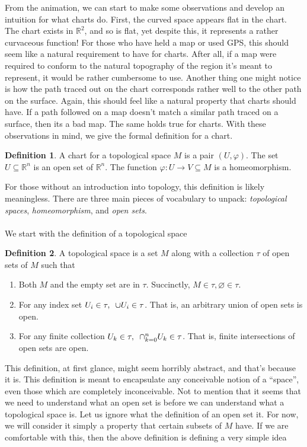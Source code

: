 \documentclass[]{article}
\let\emptyset\varnothing %
\let\phi\varphi %
\newcommand\<{\ensuremath{\left\langle}}
\renewcommand\>{\ensuremath{\right\rangle}}
\newcommand{\RR}{\ensuremath{\mathbb{R}}}
\theoremstyle{definition}
\newtheorem{definition}{Definition}[section]
\theoremstyle{definition}
\begin{document}
	From the animation, we can start to make some observations and develop an intuition for what charts do. First, the curved space appears flat in the chart. The chart exists in $\RR^2$, and so is flat, yet despite this, it represents a rather curvaceous function! For those who have held a map or used GPS, this should seem like a natural requirement to have for charts. After all, if a map were required to conform to the natural topography of the region it's meant to represent, it would be rather cumbersome to use. Another thing one might notice is how the path traced out on the chart corresponds rather well to the other path on the surface. Again, this should feel like a natural property that charts should have. If a path followed on a map doesn't match a similar path traced on a surface, then its a bad map. The same holds true for charts. With these observations in mind, we give the formal definition for a chart.
	\begin{definition}
		A chart for a topological space $M$ is a pair $(U, \phi)$. The set $U \subseteq \RR^n$ is an open set of $\RR^n$. The function $\phi : U \to V \subseteq M$ is a homeomorphism. \cite{Munkres2000}
	\end{definition}
	For those without an introduction into topology, this definition is likely meaningless. There are three main pieces of vocabulary to unpack: \textit{topological spaces}, \textit{homeomorphism}, and \textit{open sets}. \\
	\\
	We start with the definition of a topological space
	\begin{definition}
		A topological space is a set $M$ along with a collection $\tau$ of open sets of $M$ such that
		\begin{enumerate}[1.]
				\item Both $M$ and the empty set are in $\tau$. Succinctly, $M \in \tau, \emptyset \in \tau$.
				\item For any index set $U_i \in \tau, \hspace*{5px}\cup U_i \in \tau$. That is, an arbitrary union of open sets is open.
				\item For any finite collection $U_k \in \tau, \hspace*{5px}\cap^n_{k=0} U_k \in \tau$. That is, finite intersections of open sets are open. \cite{Munkres2000}
		\end{enumerate}
	\end{definition}
	This definition, at first glance, might seem horribly abstract, and that's because it is. This definition is meant to encapsulate any conceivable notion of a ``space'', even those which are completely inconceivable. Not to mention that it seems that we need to understand what an open set is before we can understand what a topological space is. Let us ignore what the definition of an open set it. For now, we will consider it simply a property that certain subsets of $M$ have. If we are comfortable with this, then the above definition is defining a very simple idea
\end{document}
